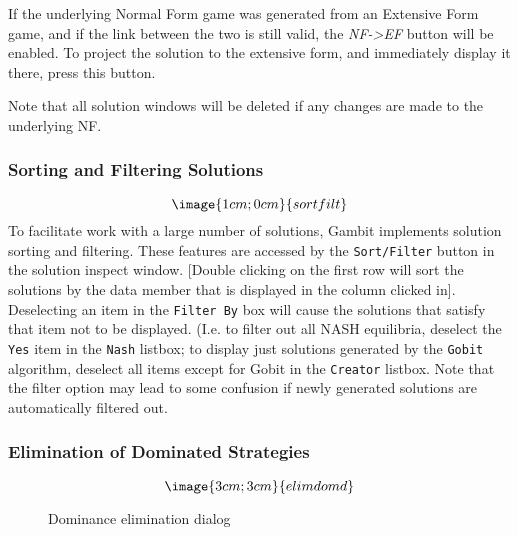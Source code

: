 If the underlying Normal Form game was generated from an Extensive Form game, 
and if the link between the two is still 
valid, the {\em NF->EF} button will be enabled.  To project the solution to the 
extensive form, and immediately display it there, press this button.

Note that all solution windows will be deleted if any changes are 
made to the underlying NF.


\subsubsection{Sorting and Filtering Solutions}\label{SolnSortFilt}
$$\image{1cm;0cm}{sortfilt}$$
To facilitate work with a large number of solutions, Gambit implements solution
sorting and filtering.  These features are accessed by the {\tt Sort/Filter} button
in the solution inspect window.
[Double clicking on the first row will sort the solutions by the data member
that is displayed in the column clicked in].  Deselecting an item in the
{\tt Filter By} box will cause the solutions that satisfy that item not to
be displayed.  (I.e. to filter out all NASH equilibria, deselect the {\tt Yes} item
in the {\tt Nash} listbox; to display just solutions generated by the {\tt Gobit}
 algorithm, deselect all items except for Gobit in the {\tt Creator} listbox.
Note that the filter option may lead to some confusion if newly generated 
solutions are automatically filtered out.


\subsubsection{Elimination of Dominated Strategies}\label{ElimDom}
\begin{figure}
$$\image{3cm;3cm}{elimdomd}$$
\caption{Dominance elimination dialog}\label{fig_elimdomd}
\end{figure}

